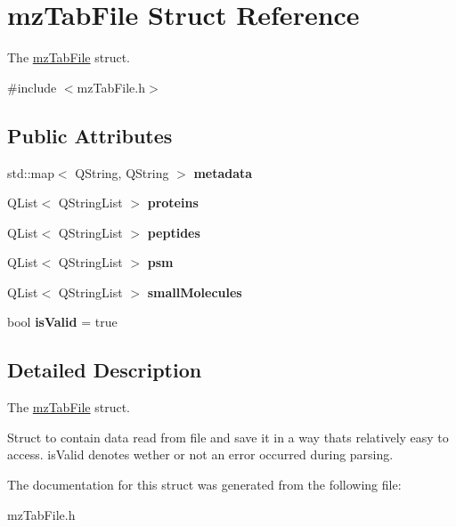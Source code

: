 \hypertarget{structmz_tab_file}{}\section{mz\+Tab\+File Struct Reference}
\label{structmz_tab_file}


The \mbox{\hyperlink{structmz_tab_file}{mz\+Tab\+File}} struct.  




{\ttfamily \#include $<$mz\+Tab\+File.\+h$>$}

\subsection*{Public Attributes}
\begin{DoxyCompactItemize}
\item 
\mbox{\label{structmz_tab_file_a6c20ef1e57959be37a12a6c77412ab50}} 
std\+::map$<$ Q\+String, Q\+String $>$ {\bfseries metadata}
\item 
\mbox{\label{structmz_tab_file_ad9b778603a2ea9c13dda56969c5a1c36}} 
Q\+List$<$ Q\+String\+List $>$ {\bfseries proteins}
\item 
\mbox{\label{structmz_tab_file_a165994178856f810865df12b475a55a6}} 
Q\+List$<$ Q\+String\+List $>$ {\bfseries peptides}
\item 
\mbox{\label{structmz_tab_file_a72f3db89bd7aea763d4684b0f12247b6}} 
Q\+List$<$ Q\+String\+List $>$ {\bfseries psm}
\item 
\mbox{\label{structmz_tab_file_a66c3e1a512b70b9a8669b227c04846b0}} 
Q\+List$<$ Q\+String\+List $>$ {\bfseries small\+Molecules}
\item 
\mbox{\label{structmz_tab_file_a5724e0be23c7762c23e4ffce0d297588}} 
bool {\bfseries is\+Valid} = true
\end{DoxyCompactItemize}


\subsection{Detailed Description}
The \mbox{\hyperlink{structmz_tab_file}{mz\+Tab\+File}} struct. 

Struct to contain data read from file and save it in a way that\textquotesingle{}s relatively easy to access. is\+Valid denotes wether or not an error occurred during parsing. 

The documentation for this struct was generated from the following file\+:\begin{DoxyCompactItemize}
\item 
mz\+Tab\+File.\+h\end{DoxyCompactItemize}
